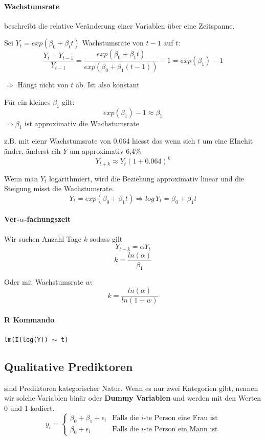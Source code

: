 \documentclass[a3paper, 8pt]{extarticle}
\begin{document}
\begin{multicols*}{5}
\begin{enumerate}
\paragraph{Wachstumsrate} beschreibt die relative Veränderung einer Variablen über eine Zeitspanne.

Sei $Y_t=exp(\beta_0+\beta_t t)$ Wachstumsrate von $t-1$ auf $t$:
$$\frac{Y_t-Y_{t-1}}{Y_{t-1}}=\frac{exp(\beta_0+\beta_1 t)}{exp(\beta_0+\beta_1(t-1))}-1=exp(\beta_1)-1$$

$\Rightarrow$ Hängt nicht von $t$ ab. Ist also konstant

Für ein kleines $\beta_1$ gilt: $$exp(\beta_1)-1 \approx \beta_1$$   $\Rightarrow \beta_1 \text{ ist approximativ die Wachstumsrate}$

z.B. mit eienr Wachstumsrate von 0.064 hiesst das wenn sich $t$ um eine EInehit änder, änderst cih $Y$ um approximativ 6,4\%
$$Y_{t+k}\approx Y_t(1+0.064)^k$$

Wenn man $Y_t$ logarithmiert, wird die Beziehung approximativ linear und die Steigung misst die Wachstumsrate. $$Y_t = exp(\beta_0+\beta_1 t) \Rightarrow log \, Y_t=\beta_0 + \beta_1 t$$


\paragraph{Ver-$\alpha$-fachungszeit}Wir suchen Anzahl Tage $k$ sodass gilt $$Y_{t+k}=\alpha Y_t$$ $$k=\frac{ln(\alpha)}{\beta_1}$$

Oder mit Wachstumsrate $w$:
$$k=\frac{ln(\alpha)}{ln(1+w)}$$

\paragraph{R Kommando}\texttt{lm(I(log(Y)) $\sim$ t)}


\subsection{Qualitative Prediktoren}
sind Prediktoren kategorischer Natur. Wenn es nur zwei Kategorien gibt, nennen wir solche Variablen binär oder \textbf{Dummy Variablen} und werden mit den Werten 0 und 1 kodiert.
$$y_i= \begin{cases}
  \beta_0+\beta_1+\epsilon_i  &  \text{Falls die $i$-te Person eine Frau ist} \\
  \beta_0+\epsilon_i & \text{Falls die $i$-te Person ein Mann ist}
\end{cases}$$



\end{enumerate}
\end{multicols*}
\end{document}
